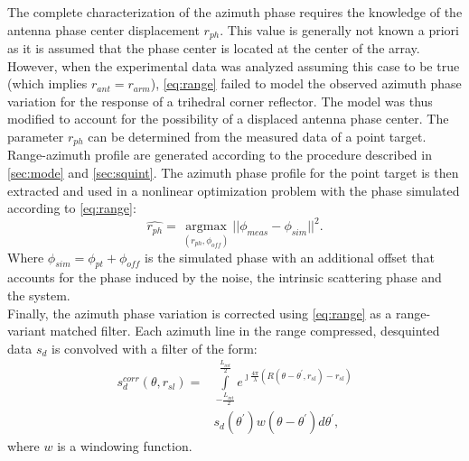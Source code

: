 The complete characterization of the azimuth phase requires the knowledge of the antenna phase center displacement $r_{ph}$. This value is generally not known a priori as it is assumed that the phase center is located at the center of the array. However, when the experimental data was analyzed assuming this case to be true (which implies $r_{ant} = r_{arm}$),  \autoref{eq:range} failed to model the observed azimuth phase variation for the response of a trihedral corner reflector. The model was thus modified to account for the possibility of a displaced antenna phase center. The parameter $r_{ph}$ can be determined from the measured data of a point target. Range-azimuth profile are generated according to the procedure described in \autoref{sec:mode} and \autoref{sec:squint}. The azimuth phase profile for the point target is then extracted and used in a nonlinear optimization problem with the phase simulated according to \autoref{eq:range}:
\begin{equation}\label{eq:rph_estimation}
	\hat{r_{ph}} = \underset{\left(r_{ph}, \phi_{off}\right)}{\operatorname{argmax}}{\vert\vert\phi_{meas} - \phi_{sim}\vert\vert}^2.
\end{equation}
Where $\phi_{sim} = \phi_{pt} + \phi_{off}$ is the simulated phase with an additional offset that accounts for the phase induced by the noise, the intrinsic scattering phase and the system.\\
Finally, the azimuth phase variation is corrected using \autoref{eq:range} as a range-variant matched filter. Each azimuth line in the range compressed, desquinted data $s_{d}$ is convolved with a filter of the form:
\begin{equation}\label{eq:correction}
	\begin{aligned}
		s_{d}^{corr}\left(\theta, r_{sl}\right) = &\int\limits_{-\frac{L_{int}}{2}}^{\frac{L_{int}}{2}}e^{\jmath \frac{4\pi}{\lambda}\left(R\left(\theta - \theta^{\prime}, r_{sl}\right) - r_{sl}\right)}\\
		&s_{d}\left(\theta^\prime\right)w(\theta - \theta^{\prime}) d\theta^\prime,
	\end{aligned}
\end{equation}
where $w$ is a windowing function.
